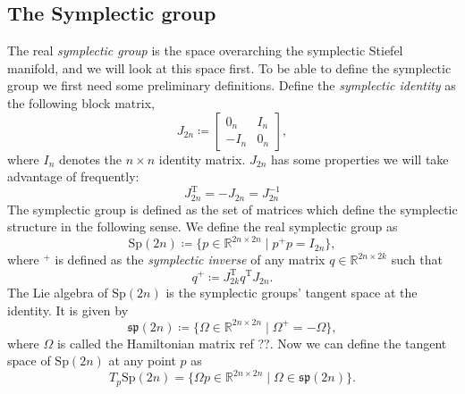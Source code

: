 \subsection{The Symplectic group}
The real \textit{symplectic group} is the space overarching the symplectic Stiefel manifold, and we will look at this space first. To be able to define the symplectic group we first need some preliminary definitions. Define the \textit{symplectic identity} as the following block matrix,
\begin{equation*}
    J_{2n}\coloneqq\begin{bmatrix}
        0_{n} & I_{n} \\
        -I_{n} & 0_{n}
    \end{bmatrix},
\end{equation*}
where $I_{n}$ denotes the $n\times n$ identity matrix. $J_{2n}$ has some properties we will take advantage of frequently:
\begin{equation}\label{eq:J_2n_properties}
    J_{2n} ^{\mathrm{T}}=-J_{2n}=J_{2n}^{-1}
\end{equation}
The symplectic group is defined as the set of matrices which define the symplectic structure in the following sense. We define the real symplectic group as %
\begin{equation}\label{eq:sp_def}
    \mathrm{Sp}(2n)\coloneqq \{p\in \mathbb{R}^{2n\times2n} \;|\; p^{+}p=I_{2n}\},
\end{equation}
where $^{+}$ is defined as the \textit{symplectic inverse} of any matrix $q\in\mathbb{R}^{2n\times2k}$ such that 
\begin{equation}\label{eq:symplectic_inverse}
    q^{+}\coloneqq J_{2k}^{\mathrm{T}}q ^{\mathrm{T}}J_{2n}.
\end{equation}
The Lie algebra of $\mathrm{Sp}(2n)$ is the symplectic groups' tangent space at the identity. It is given by 
\begin{equation}\label{eq:sp_Lie_algebra}
    \mathfrak{sp}(2n)\coloneqq \{\Omega\in \mathbb{R}^{2n\times2n} \;|\; \Omega^{+}=-\Omega\},
\end{equation}
where $\Omega$ is called the Hamiltonian matrix ref ??. 
Now we can define the tangent space of $\mathrm{Sp}(2n)$ at any point $p$  as
\begin{equation}\label{eq:sp_tangent_space}
    T_{p}\mathrm{Sp}(2n)=\{\Omega p\in \mathbb{R}^{2n\times2n} \;|\; \Omega\in\mathfrak{sp}(2n)\}.
\end{equation}


